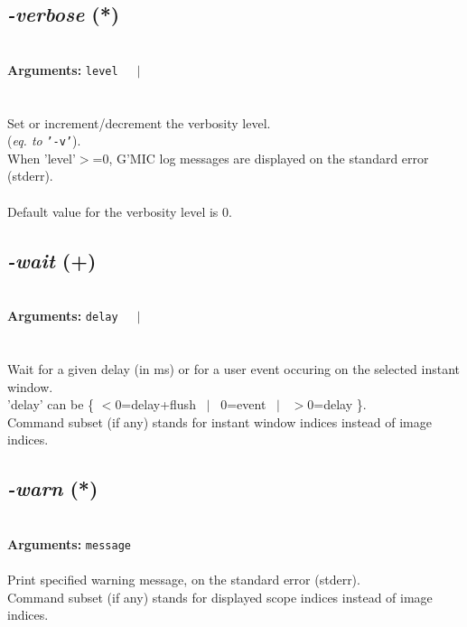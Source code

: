 \documentclass[a4paper,11pt,twoside]{book}
\begin{document}
\subsection{\emph{-verbose} (*)}\vspace*{-0.5em}
~\\\textbf{Arguments: } 
{\small \texttt{level}}~~~$|$\\
\hspace*{2.2cm}{\small \texttt{\{ + ~$|$~ - \}}}\\~\\
Set or increment/decrement the verbosity level.
~\\(\emph{eq. to} {\small \texttt{'-v'}}).
~\\When 'level'$>$=0, G'MIC log messages are displayed on the standard error (stderr).
~\\~\\Default value for the verbosity level is 0.


\subsection{\emph{-wait} (+)}\vspace*{-0.5em}
~\\\textbf{Arguments: } 
{\small \texttt{delay}}~~~$|$\\
\\~\\
Wait for a given delay (in ms) or for a user event occuring on the selected instant window.
~\\'delay' can be \{ $<$0=delay+flush ~$|$~  0=event ~$|$~ $>$0=delay \}.
~\\Command subset (if any) stands for instant window indices instead of image indices.


\subsection{\emph{-warn} (*)}\vspace*{-0.5em}
~\\\textbf{Arguments: } 
{\small \texttt{message}}\\~\\
Print specified warning message, on the standard error (stderr).
~\\Command subset (if any) stands for displayed scope indices instead of image indices.
\end{document}
